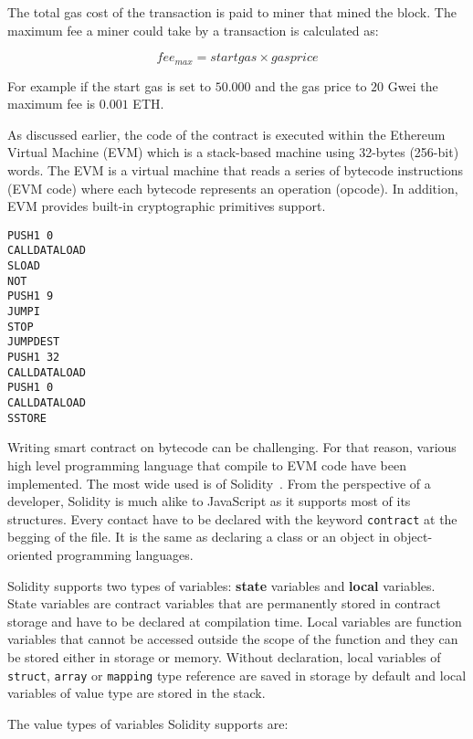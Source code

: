 The total gas cost of the transaction is paid to miner that mined the block. The maximum fee a miner could take by a transaction is calculated as:

\begin{equation*}
  fee_{max} = startgas \times gasprice
\end{equation*}

For example if the start gas is set to $50.000$ and the gas price to $20$ Gwei the maximum fee is $0.001$ ETH.

As discussed earlier, the code of the contract is executed within the Ethereum Virtual Machine (EVM) which is a stack-based machine using 32-bytes (256-bit) words. The EVM is a virtual machine that reads a series of bytecode instructions (EVM code) where each bytecode represents an operation (opcode). In addition, EVM provides built-in cryptographic primitives support.

\begin{lstlisting}[language=Solidity, caption={EVM bytecode}]
PUSH1 0
CALLDATALOAD
SLOAD
NOT
PUSH1 9
JUMPI
STOP
JUMPDEST
PUSH1 32
CALLDATALOAD
PUSH1 0
CALLDATALOAD
SSTORE
\end{lstlisting}

Writing smart contract on bytecode can be challenging. For that reason, various high level programming language that compile to EVM code have been implemented. The most wide used is of Solidity~\cite{solidity}. From the perspective of a developer, Solidity is much alike to JavaScript as it supports most of its structures. Every contact have to be declared with the keyword \verb|contract| at the begging of the file. It is the same as declaring a class or an object in object-oriented programming languages.

Solidity supports two types of variables: \textbf{state} variables and \textbf{local} variables. State variables are contract variables that are permanently stored in contract storage and have to be declared at compilation time. Local variables are function variables that cannot be accessed outside the scope of the function and they can be stored either in storage or memory. Without declaration, local variables of \verb|struct|, \verb|array| or \verb|mapping| type reference are saved in storage by default and local variables of value type are stored in the stack.

The value types of variables Solidity supports are:

